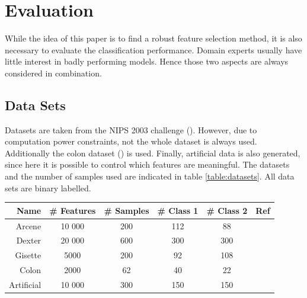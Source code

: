 \documentclass[twoside,11pt]{article}
\begin{document}
\section{Evaluation}

While the idea of this paper is to find a robust feature selection method, it is also necessary to evaluate the classification performance. Domain experts usually have little interest in badly performing models. Hence those two aspects are always considered in combination.

\subsection{Data Sets}
Datasets are taken from the NIPS 2003 challenge (\cite{NIPS}). However, due to computation power constraints, not the whole dataset is always used. Additionally the colon dataset (\cite{alon1999broad}) is used. Finally, artificial data is also generated, since here it is possible to control which features are meaningful. The datasets and the number of samples used are indicated in table \ref{table:datasets}. All data sets are binary labelled.

\begin{center}
    \begin{tabular}{| r | c | c | c | c | c |}
    \hline
    Name & \# Features & \# Samples & \# Class 1 & \# Class 2 & Ref\\ \hline
    Arcene & 10 000 & 200 & 112 & 88 & \cite{NIPS} \\
    Dexter & 20 000 & 600 & 300 & 300 & \cite{NIPS} \\
    Gisette & 5000 & 200 & 92 & 108 & \cite{NIPS} \\
    Colon & 2000 & 62 & 40 & 22 &  \cite{alon1999broad} \\
    Artificial & 10 000 & 300 & 150 & 150 & \\
    \hline
    \end{tabular}
  \label{table:datasets}
\end{center}
\end{document}
